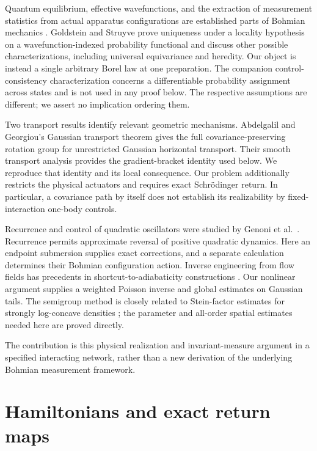 \documentclass[11pt]{article}
\numberwithin{equation}{section}
\theoremstyle{definition}
\begin{document}
Quantum equilibrium, effective wavefunctions, and the extraction of
measurement statistics from actual apparatus configurations are established
parts of Bohmian mechanics \citep{DGZ1992,DGZ2004}. Goldstein and Struyve
\citep{GS2007} prove uniqueness under a locality hypothesis on a
wavefunction-indexed probability functional and discuss other possible
characterizations, including universal equivariance and heredity.
Our object is instead a single arbitrary Borel law at one preparation.
The companion control-consistency characterization \citep{Rodgers2026}
concerns a differentiable probability assignment across states and is
not used in any proof below. The respective assumptions are different;
we assert no implication ordering them.

Two transport results identify relevant geometric mechanisms.
Abdelgalil and Georgiou's Gaussian transport theorem
\citep[version 2, Proposition 4 and Corollary 1]{AGGaussian}
gives the full covariance-preserving rotation group for unrestricted
Gaussian horizontal transport. Their smooth transport analysis
\citep[version 2, Proposition 1, equation (10)]{AGSmooth}
provides the gradient-bracket identity used below. We reproduce that
identity and its local consequence. Our problem additionally restricts
the physical actuators and requires exact Schr\"odinger return.
In particular, a covariance path by itself does not establish its
realizability by fixed-interaction one-body controls.

Recurrence and control of quadratic oscillators were studied by
Genoni et al.\ \citep{Genoni2012}. Recurrence permits approximate reversal
of positive quadratic dynamics. Here an endpoint submersion supplies
exact corrections, and a separate calculation determines their Bohmian
configuration action. Inverse engineering from flow fields has precedents
in shortcut-to-adiabaticity constructions \citep{Patra2017}. Our nonlinear
argument supplies a weighted Poisson inverse and global estimates on
Gaussian tails. The semigroup method is closely related to Stein-factor
estimates for strongly log-concave densities \citep{Mackey2016};
the parameter and all-order spatial estimates needed here are proved
directly.

The contribution is this physical realization and invariant-measure
argument in a specified interacting network, rather than a new
derivation of the underlying Bohmian measurement framework.

\section{Hamiltonians and exact return maps}\label{sec:model}
\end{document}
